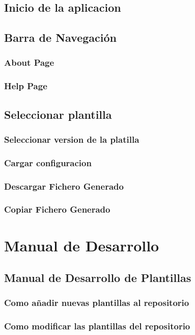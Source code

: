 \documentclass[12pt, a4paper, twoside]{article}
\begin{document}
\begin{umaappendices}
	\subsection{Inicio de la aplicacion}
	\subsection{Barra de Navegación}
	\subsubsection{About Page}
	\subsubsection{Help Page}
	\subsection{Seleccionar plantilla}
	\subsubsection{Seleccionar version de la platilla}
	\subsubsection{Cargar configuracion}
	\subsubsection{Descargar Fichero Generado}
	\subsubsection{Copiar Fichero Generado}




	\section{Manual de Desarrollo}
	\label{sec:Manual de Desarrollo}
	\subsection{Manual de Desarrollo de Plantillas}
	\subsubsection{Como añadir nuevas plantillas al repositorio}
	\subsubsection{Como modificar las plantillas del repositorio}




\end{umaappendices}



\end{document}
